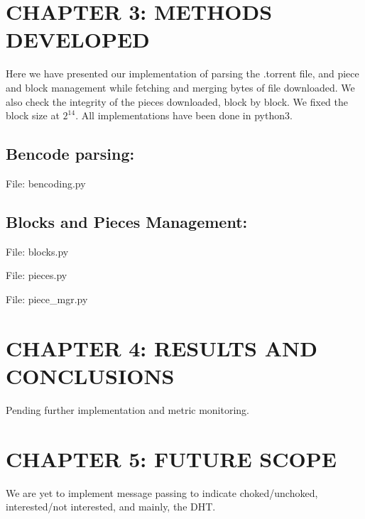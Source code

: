 \documentclass[a4paper,12pt]{article}
\begin{document}
\clearpage
\section{\large CHAPTER 3: METHODS DEVELOPED}

Here we have presented our implementation of parsing the .torrent file, and piece and block management while fetching and merging bytes of file downloaded. We also check the integrity of the pieces downloaded, block by block. We fixed the block size at $2^{14}$. All implementations have been done in python3.

\subsection{Bencode parsing:}
File: bencoding.py


\subsection{Blocks and Pieces Management:}
File: blocks.py

\vspace{2em}
File: pieces.py

\vspace{2em}
File: piece{\_}mgr.py


\clearpage
\section{\large CHAPTER 4: RESULTS AND CONCLUSIONS}

Pending further implementation and metric monitoring.

\clearpage
\section{\large CHAPTER 5: FUTURE SCOPE}

We are yet to implement message passing to indicate choked/unchoked, interested/not interested, and mainly, the DHT.

\clearpage


\end{document}
